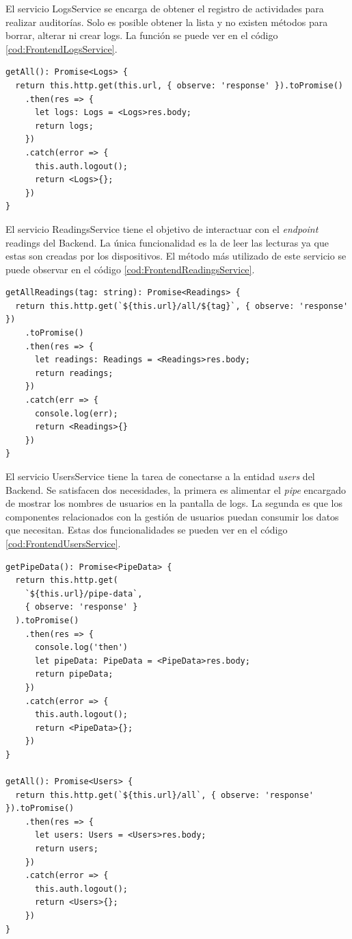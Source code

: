 El servicio LogsService se encarga de obtener el registro de actividades para realizar auditorías.
Solo es posible obtener la lista y no existen métodos para borrar, alterar ni crear logs. La función se puede ver en el código \ref{cod:FrontendLogsService}.

\begin{lstlisting}[label=cod:FrontendLogsService,caption=Obtención de la lista de logs]
getAll(): Promise<Logs> {
  return this.http.get(this.url, { observe: 'response' }).toPromise()
    .then(res => {
      let logs: Logs = <Logs>res.body;
      return logs;
    })
    .catch(error => {
      this.auth.logout();
      return <Logs>{};
    })
}
\end{lstlisting}

El servicio ReadingsService tiene el objetivo de interactuar con el \emph{endpoint} readings del Backend.
La única funcionalidad es la de leer las lecturas ya que estas son creadas por los dispositivos.
El método más utilizado de este servicio se puede observar en el código \ref{cod:FrontendReadingsService}.

\begin{lstlisting}[label=cod:FrontendReadingsService,caption=Obtención de mediciones]
getAllReadings(tag: string): Promise<Readings> {
  return this.http.get(`${this.url}/all/${tag}`, { observe: 'response' })
    .toPromise()
    .then(res => {
      let readings: Readings = <Readings>res.body;
      return readings;
    })
    .catch(err => {
      console.log(err);
      return <Readings>{}
    })
}
\end{lstlisting}

El servicio UsersService tiene la tarea de conectarse a la entidad \emph{users} del Backend.
Se satisfacen dos necesidades, la primera es alimentar el \emph{pipe} encargado de mostrar los nombres de usuarios en la pantalla de logs.
La segunda es que los componentes relacionados con la gestión de usuarios puedan consumir los datos que necesitan.
Estas dos funcionalidades se pueden ver en el código \ref{cod:FrontendUsersService}. 

\newpage

\begin{lstlisting}[label=cod:FrontendUsersService,caption=Funciones de UsersService]
getPipeData(): Promise<PipeData> {
  return this.http.get(
    `${this.url}/pipe-data`,
    { observe: 'response' }
  ).toPromise()
    .then(res => {
      console.log('then')
      let pipeData: PipeData = <PipeData>res.body;
      return pipeData;
    })
    .catch(error => {
      this.auth.logout();
      return <PipeData>{};
    })
}

getAll(): Promise<Users> {
  return this.http.get(`${this.url}/all`, { observe: 'response' }).toPromise()
    .then(res => {
      let users: Users = <Users>res.body;
      return users;
    })
    .catch(error => {
      this.auth.logout();
      return <Users>{};
    })
}
\end{lstlisting}

